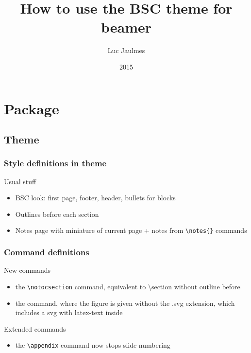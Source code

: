 \documentclass[c,12pt]{beamer}
\title[BSC styled beamer tutorial]{How to use the BSC theme for beamer}
\author{Luc Jaulmes}
\date{2015}
\begin{document}
\begin{frame}
\titlepage
\end{frame}

\section{Package}
\subsection{Theme}

\begin{frame}[fragile]
	\frametitle{Style definitions in theme}
	\begin{block}{Usual stuff}
		\begin{itemize}
			\item BSC look: first page, footer, header, bullets for blocks
			\item Outlines before each section
			\item Notes page with miniature of current page + notes from \verb|\notes{}| commands
		\end{itemize}
	\end{block}
\end{frame}

\begin{frame}[fragile]
	\frametitle{Command definitions}
	\begin{block}{New commands}
		\begin{itemize}
			\item the \verb|\notocsection| command, equivalent to \textbackslash section without outline before
			\item the \verb|| command, where the figure is given without the .svg extension, which includes a svg with latex-text inside
		\end{itemize}
	\end{block}
	\pause
	\begin{block}{Extended commands}
		\begin{itemize}
			\item the \verb|\appendix| command now stops slide numbering
		\end{itemize}
	\end{block}
\end{frame}
\end{document}

